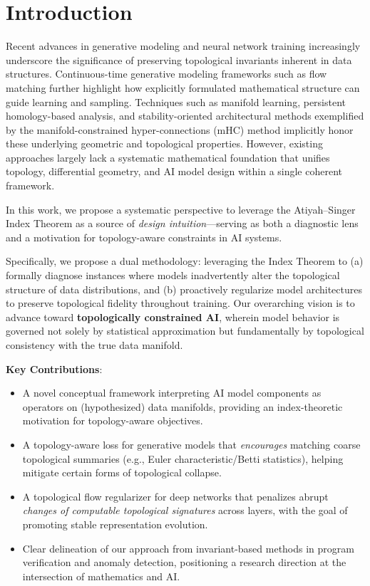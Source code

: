 \documentclass[10pt,leqno]{amsart}
\begin{document}
\section{Introduction}
Recent advances in generative modeling and neural network training increasingly underscore the significance of preserving topological invariants inherent in data structures. Continuous-time generative modeling frameworks such as flow matching \cite{lipman2023flow} further highlight how explicitly formulated mathematical structure can guide learning and sampling. Techniques such as manifold learning, persistent homology-based analysis, and stability-oriented architectural methods exemplified by the manifold-constrained hyper-connections (mHC) method \cite{deepseek2025mhc} implicitly honor these underlying geometric and topological properties. However, existing approaches largely lack a systematic mathematical foundation that unifies topology, differential geometry, and AI model design within a single coherent framework.

In this work, we propose a systematic perspective to leverage the Atiyah--Singer Index Theorem as a source of \emph{design intuition}---serving as both a diagnostic lens and a motivation for topology-aware constraints in AI systems.

Specifically, we propose a dual methodology: leveraging the Index Theorem to (a) formally diagnose instances where models inadvertently alter the topological structure of data distributions, and (b) proactively regularize model architectures to preserve topological fidelity throughout training. Our overarching vision is to advance toward \textbf{topologically constrained AI}, wherein model behavior is governed not solely by statistical approximation but fundamentally by topological consistency with the true data manifold.

\textbf{Key Contributions}:
\begin{itemize}
    \item A novel conceptual framework interpreting AI model components as operators on (hypothesized) data manifolds, providing an index-theoretic motivation for topology-aware objectives.
    \item A topology-aware loss for generative models that \emph{encourages} matching coarse topological summaries (e.g., Euler characteristic/Betti statistics), helping mitigate certain forms of topological collapse.
    \item A topological flow regularizer for deep networks that penalizes abrupt \emph{changes of computable topological signatures} across layers, with the goal of promoting stable representation evolution.
    \item Clear delineation of our approach from invariant-based methods in program verification and anomaly detection, positioning a research direction at the intersection of mathematics and AI.
\end{itemize}
\end{document}
